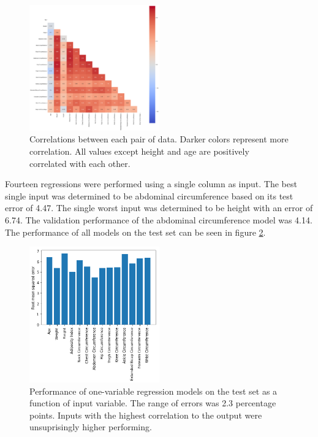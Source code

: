 \documentclass{IEEEtran}
\begin{document}
\begin{centering}
\begin{figure}
\centering
\begin{center}
	\includegraphics[width=0.5\textwidth]{corr_matrix}
	\caption{Correlations between each pair of data. Darker colors represent more correlation. All values except height and age are positively correlated with each other.\label{fig:corr_matrix}}
\end{center}
\end{figure}
\end{centering}

Fourteen regressions were performed using a single column as input. The best single input was determined to be abdominal circumference based on its test error of 4.47. The single worst input was determined to be height with an error of 6.74. The validation performance of the abdominal circumference model was 4.14. The performance of all models on the test set can be seen in figure \ref{fig:one_var_perf}.

\begin{centering}
\begin{figure}
\centering
\begin{center}
	\includegraphics[width=0.5\textwidth]{one_var_perf}
	\caption{Performance of one-variable regression models on the test set as a function of input variable. The range of errors was 2.3 percentage points. Inputs with the highest correlation to the output were unsuprisingly higher performing.\label{fig:one_var_perf}}
\end{center}
\end{figure}
\end{centering}
\end{document}
